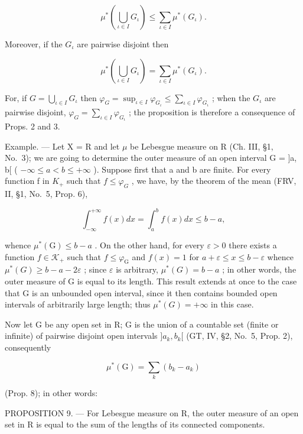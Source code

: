 \[
\mu^ {*} \left(\bigcup_ {\iota \in I} G _ {\iota}\right) \leqslant \sum_ {\iota \in I} \mu^ {*} (G _ {\iota}).\tag{6}
\]

Moreover, if the \(G_{\iota}\) are pairwise disjoint then

\[
\mu^ {*} \left(\bigcup_ {\iota \in I} G _ {\iota}\right) = \sum_ {\iota \in I} \mu^ {*} (G _ {\iota}).\tag{7}
\]

For, if \(G = \bigcup_{\iota \in I} G_{\iota}\) then \(\varphi_{G} = \sup_{\iota \in I} \varphi_{G_{\iota}} \leqslant \sum_{\iota \in I} \varphi_{G_{\iota}}\) ; when the \(G_{\iota}\) are pairwise disjoint, \(\varphi_{G} = \sum_{\iota \in I} \varphi_{G_{\iota}}\) ; the proposition is therefore a consequence of Props. 2 and 3.

Example. --- Let X = R and let \(\mu\) be Lebesgue measure on R (Ch. III, §1, No.~3); we are going to determine the outer measure of an open interval G = {]}a, b{[} ( \(-\infty \leqslant a < b \leqslant +\infty\) ). Suppose first that a and b are finite. For every function f in \(K_{+}\) such that \(f \leqslant \varphi_{G}\) , we have, by the theorem of the mean (FRV, II, §1, No.~5, Prop. 6),

\[
\int_ {- \infty} ^ {+ \infty} f (x) d x = \int_ {a} ^ {b} f (x) d x \leqslant b - a,
\]

whence \(\mu^{*}(\mathrm{G})\leqslant b - a\) . On the other hand, for every \(\varepsilon >0\) there exists a function \(f\in \mathcal{K}_{+}\) such that \(f\leqslant \varphi_{\mathrm{G}}\) and \(f(x) = 1\) for \(a + \varepsilon \leqslant x\leqslant b - \varepsilon\) whence \(\mu^{*}(G) \geqslant b - a - 2\varepsilon\) ; since \(\varepsilon\) is arbitrary, \(\mu^{*}(G) = b - a\) ; in other words, the outer measure of G is equal to its length. This result extends at once to the case that G is an unbounded open interval, since it then contains bounded open intervals of arbitrarily large length; thus \(\mu^{*}(G) = +\infty\) in this case.

Now let G be any open set in R; G is the union of a countable set (finite or infinite) of pairwise disjoint open intervals \({]}a_{k}, b_{k}{[}\) (GT, IV, §2, No.~5, Prop. 2), consequently

\[
\mu^ {*} (\mathrm{G}) = \sum_ {k} (b _ {k} - a _ {k})
\]

(Prop. 8); in other words:

PROPOSITION 9. --- For Lebesgue measure on R, the outer measure of an open set in R is equal to the sum of the lengths of its connected components.

